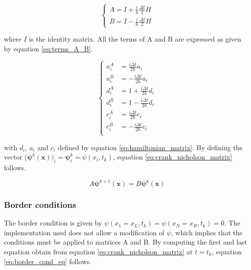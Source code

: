 \documentclass[a4paper,12pt,twoside]{article}
\newcommand{\mbf}[1]{\mathbf{#1}} %
\begin{document}
      \begin{equation}
        \begin{cases}
          A = I + \frac{i}{\hbar}\frac{\Delta t}{2}H \\
          B = I - \frac{i}{\hbar}\frac{\Delta t}{2}H
        \end{cases}
        \label{eq:A_B_identification}
      \end{equation}

      where $I$ is the identity matrix.
      All the terms of A and B are expressed as given by equation \eqref{eq:terms_A_B}.

      \begin{equation}
        \begin{cases}
          a_i^A &= \frac{i\Delta t}{2\hbar} a_i\\
          a_i^B &= -\frac{i\Delta t}{2\hbar} a_i\\
          d_i^A &= 1 + \frac{i\Delta t}{2\hbar} d_i\\
          d_i^B &= 1 - \frac{i\Delta t}{2\hbar} d_i\\
          c_i^A &= \frac{i\Delta t}{2\hbar} c_i\\
          c_i^B &= -\frac{i\Delta t}{2\hbar} c_i\\
        \end{cases}
        \label{eq:terms_A_B}
      \end{equation}

      with $d_i$, $a_i$ and $c_i$ defined by equation \eqref{eq:hamiltonian_matrix}.
      By defining the vector ($\mbf{\psi}^k(\mbf{x}))_i = \mbf{\psi}_i^k = \psi(x_i, t_k)$, equation \eqref{eq:crank_nicholson_matrix} follows.

      \begin{equation}
        A\mbf{\psi}^{k+1}(\mbf{x}) = B\mbf{\psi}^k(\mbf{x})
        \label{eq:crank_nicholson_matrix}
      \end{equation}


    \subsubsection{Border conditions}
      The border condition is given by $\psi(x_1 = x_L, t_k) = \psi(x_N = x_R, t_k) = 0$.
      The implementation used does not allow a modification of $\psi$, which implies that the conditions must be applied to matrices A and B.
      By computing the first and last equation obtain from equation \eqref{eq:crank_nicholson_matrix} at $t=t_k$, equation \eqref{eq:border_cond_eq} follows.
\end{document}
